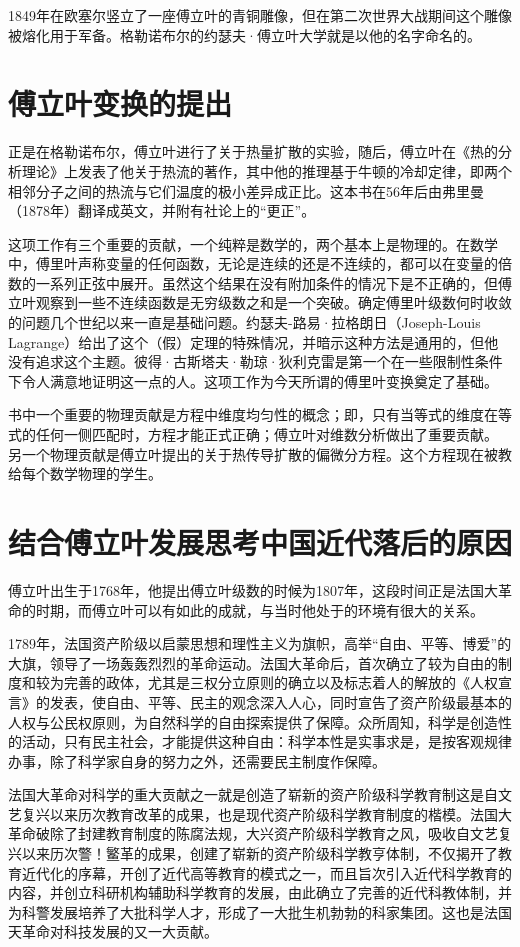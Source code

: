 \documentclass{../source/Paper}
\begin{document}
1849年在欧塞尔竖立了一座傅立叶的青铜雕像，但在第二次世界大战期间这个雕像被熔化用于军备。格勒诺布尔的约瑟夫·傅立叶大学就是以他的名字命名的。


\section{傅立叶变换的提出}

正是在格勒诺布尔，傅立叶进行了关于热量扩散的实验，随后，傅立叶在《热的分析理论》上发表了他关于热流的著作，其中他的推理基于牛顿的冷却定律，即两个相邻分子之间的热流与它们温度的极小差异成正比。这本书在56年后由弗里曼（1878年）翻译成英文，并附有社论上的“更正”。

这项工作有三个重要的贡献，一个纯粹是数学的，两个基本上是物理的。在数学中，傅里叶声称变量的任何函数，无论是连续的还是不连续的，都可以在变量的倍数的一系列正弦中展开。虽然这个结果在没有附加条件的情况下是不正确的，但傅立叶观察到一些不连续函数是无穷级数之和是一个突破。确定傅里叶级数何时收敛的问题几个世纪以来一直是基础问题。约瑟夫-路易·拉格朗日（Joseph-Louis
Lagrange）给出了这个（假）定理的特殊情况，并暗示这种方法是通用的，但他没有追求这个主题。彼得·古斯塔夫·勒琼·狄利克雷是第一个在一些限制性条件下令人满意地证明这一点的人。这项工作为今天所谓的傅里叶变换奠定了基础。

书中一个重要的物理贡献是方程中维度均匀性的概念；即，只有当等式的维度在等式的任何一侧匹配时，方程才能正式正确；傅立叶对维数分析做出了重要贡献。
另一个物理贡献是傅立叶提出的关于热传导扩散的偏微分方程。这个方程现在被教给每个数学物理的学生。


\section{结合傅立叶发展思考中国近代落后的原因}

傅立叶出生于1768年，他提出傅立叶级数的时候为1807年，这段时间正是法国大革命的时期，而傅立叶可以有如此的成就，与当时他处于的环境有很大的关系。

1789年，法国资产阶级以启蒙思想和理性主义为旗帜，⾼举``⾃由、平等、博爱''的⼤旗，领导了⼀场轰轰烈烈的⾰命运动。法国⼤⾰命后，⾸次确⽴了较为⾃由的制度和较为完善的政体，尤其是三权分⽴原则的确⽴以及标志着⼈的解放的《⼈权宣⾔》的发表，使⾃由、平等、民主的观念深⼊⼈⼼，同时宣告了资产阶级最基本的⼈权与公民权原则，为⾃然科学的⾃由探索提供了保障。众所周知，科学是创造性的活动，只有民主社会，才能提供这种⾃由：科学本性是实事求是，是按客观规律办事，除了科学家⾃⾝的努⼒之外，还需要民主制度作保障。

法国⼤⾰命对科学的重⼤贡献之⼀就是创造了崭新的资产阶级科学教育制这是⾃⽂艺复兴以来历次教育改⾰的成果，也是现代资产阶级科学教育制度的楷模。法国⼤⾰命破除了封建教育制度的陈腐法规，⼤兴资产阶级科学教育之风，吸收⾃⽂艺复兴以来历次警！鳘⾰的成果，创建了崭新的资产阶级科学教亨体制，不仅揭开了教育近代化的序幕，开创了近代⾼等教育的模式之⼀，⽽且旨次引⼊近代科学教育的内容，并创⽴科研机构辅助科学教育的发展，由此确⽴了完善的近代科教体制，并为科警发展培养了⼤批科学⼈才，形成了⼀⼤批⽣机勃勃的科家集团。这也是法国天⾰命对科技发展的⼜⼀⼤贡献。
\end{document}

